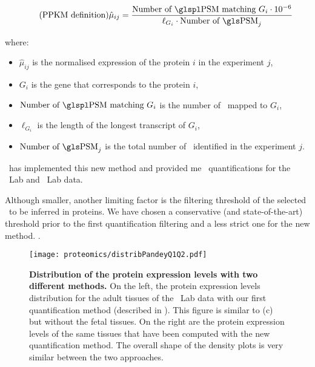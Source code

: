 \begin{minipage}{\textwidth}
\begin{equation}\label{eq:PPKM}
    \tag{PPKM definition}
    \hat{\mu}_{ij} = \frac{\text{Number of \psms\ matching } G_i \cdot10^{-6}}{\ell_{G_i}\cdot \text{Number of \psm}_j}
\end{equation}

where:{\small
\begin{itemize}[topsep=0pt,nosep]
    \item $\hat{\mu}_{ij}$ is the normalised expression of the protein $i$
        in the experiment $j$,
    \item $G_i$ is the gene that corresponds to the protein $i$,
    \item $\text{Number of \psms\ matching } G_i$ is the number of \psms\ mapped
        to $G_i$,
    \item $\ell_{G_i}$ is the length of the longest transcript of $G_i$,
    \item $\text{Number of \psm}_j$ is the total number of \psms\ identified in
the experiment $j$.
\end{itemize}
}
\end{minipage}

\james\ has implemented this new method and provided me
\PPKM\ quantifications for the \pandey\ Lab and \kuster\ Lab data.\mybr\

Although smaller,
another limiting factor is the filtering threshold of the selected \psms\
to be inferred in proteins.
We have chosen a conservative (and state-of-the-art) threshold prior to
the first quantification filtering
and a less strict one for the new method.
.\mybr\

\begin{figure}[!htbp]
    \texttt{[image: proteomics/distribPandeyQ1Q2.pdf]}\centering
    \vspace{-2mm}
    \caption[Pandey Lab data protein expression distribution
    with two quantification methods]{\label{fig:pandeyDistribQ1Q2}\textbf{Distribution
    of the protein expression levels with two different methods.}
    On the left, the protein expression levels distribution for the adult
    tissues of the \pandey\ Lab data with our first quantification method
    (described in \Cref{subsec:msDataProcess}).
    This figure is similar to (c) but without the fetal tissues.
    On the right are the protein expression levels of the same tissues that
    have been computed with the new quantification method.
    The overall shape of the density plots is very similar between the two approaches.
    }
\end{figure}

